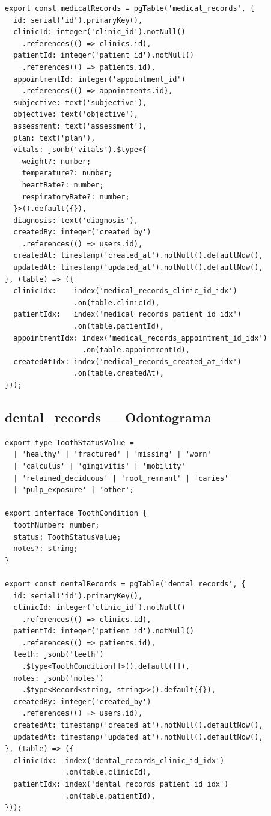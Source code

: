 \begin{lstlisting}[style=typescript, caption=Esquema medical\_records]
export const medicalRecords = pgTable('medical_records', {
  id: serial('id').primaryKey(),
  clinicId: integer('clinic_id').notNull()
    .references(() => clinics.id),
  patientId: integer('patient_id').notNull()
    .references(() => patients.id),
  appointmentId: integer('appointment_id')
    .references(() => appointments.id),
  subjective: text('subjective'),
  objective: text('objective'),
  assessment: text('assessment'),
  plan: text('plan'),
  vitals: jsonb('vitals').$type<{
    weight?: number;
    temperature?: number;
    heartRate?: number;
    respiratoryRate?: number;
  }>().default({}),
  diagnosis: text('diagnosis'),
  createdBy: integer('created_by')
    .references(() => users.id),
  createdAt: timestamp('created_at').notNull().defaultNow(),
  updatedAt: timestamp('updated_at').notNull().defaultNow(),
}, (table) => ({
  clinicIdx:    index('medical_records_clinic_id_idx')
                .on(table.clinicId),
  patientIdx:   index('medical_records_patient_id_idx')
                .on(table.patientId),
  appointmentIdx: index('medical_records_appointment_id_idx')
                  .on(table.appointmentId),
  createdAtIdx: index('medical_records_created_at_idx')
                .on(table.createdAt),
}));
\end{lstlisting}

\subsection{dental\_records --- Odontograma}

\begin{lstlisting}[style=typescript, caption=Esquema dental\_records]
export type ToothStatusValue =
  | 'healthy' | 'fractured' | 'missing' | 'worn'
  | 'calculus' | 'gingivitis' | 'mobility'
  | 'retained_deciduous' | 'root_remnant' | 'caries'
  | 'pulp_exposure' | 'other';

export interface ToothCondition {
  toothNumber: number;
  status: ToothStatusValue;
  notes?: string;
}

export const dentalRecords = pgTable('dental_records', {
  id: serial('id').primaryKey(),
  clinicId: integer('clinic_id').notNull()
    .references(() => clinics.id),
  patientId: integer('patient_id').notNull()
    .references(() => patients.id),
  teeth: jsonb('teeth')
    .$type<ToothCondition[]>().default([]),
  notes: jsonb('notes')
    .$type<Record<string, string>>().default({}),
  createdBy: integer('created_by')
    .references(() => users.id),
  createdAt: timestamp('created_at').notNull().defaultNow(),
  updatedAt: timestamp('updated_at').notNull().defaultNow(),
}, (table) => ({
  clinicIdx:  index('dental_records_clinic_id_idx')
              .on(table.clinicId),
  patientIdx: index('dental_records_patient_id_idx')
              .on(table.patientId),
}));
\end{lstlisting}

